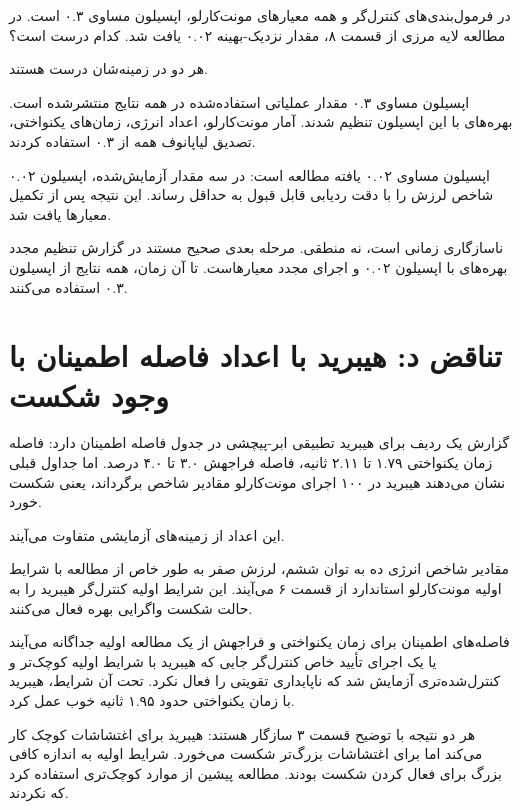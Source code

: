 \documentclass[12pt, a4paper]{article}
\newcommand{\dash}{\lr{---}}
\begin{document}
در فرمول‌بندی‌های کنترل‌گر و همه معيارهای مونت‌کارلو، اپسيلون مساوی ۰.۳ است. در مطالعه لايه مرزی  از قسمت ۸، مقدار نزديک-بهينه ۰.۰۲ يافت شد. کدام درست است؟

هر دو در زمينه‌شان درست هستند.

اپسيلون مساوی ۰.۳ مقدار عملياتی استفاده‌شده در همه نتايج منتشرشده است. بهره‌های  با اين اپسيلون تنظيم شدند. آمار مونت‌کارلو، اعداد انرژی، زمان‌های يکنواختی، تصديق لياپانوف \dash{} همه از ۰.۳ استفاده کردند.

اپسيلون مساوی ۰.۰۲ يافته مطالعه  است: در سه مقدار آزمايش‌شده، اپسيلون ۰.۰۲ شاخص لرزش  را با دقت رديابی قابل قبول به حداقل رساند. اين نتيجه پس از تکميل معيارها يافت شد.

ناسازگاری زمانی است، نه منطقی. مرحله بعدی صحيح \dash{} مستند در گزارش \dash{} تنظيم مجدد بهره‌های  با اپسيلون ۰.۰۲ و اجرای مجدد معيارهاست. تا آن زمان، همه نتايج از اپسيلون ۰.۳ استفاده می‌کنند.

\section{تناقض د: هيبريد با اعداد فاصله اطمينان با وجود شکست}

گزارش يک رديف برای هيبريد تطبيقی ابر-پيچشی در جدول فاصله اطمينان دارد: فاصله زمان يکنواختی ۱.۷۹ تا ۲.۱۱ ثانيه، فاصله فراجهش ۳.۰ تا ۴.۰ درصد. اما جداول قبلی نشان می‌دهند هيبريد در ۱۰۰ اجرای مونت‌کارلو مقادير شاخص برگرداند، يعنی شکست خورد.

اين اعداد از زمينه‌های آزمايشی متفاوت می‌آيند.

مقادير شاخص \dash{} انرژی ده به توان ششم، لرزش صفر \dash{} به طور خاص از مطالعه  با شرايط اوليه مونت‌کارلو استاندارد از قسمت ۶ می‌آيند. اين شرايط اوليه کنترل‌گر هيبريد را به حالت شکست واگرايی بهره فعال می‌کنند.

فاصله‌های اطمينان برای زمان يکنواختی و فراجهش از يک مطالعه اوليه جداگانه می‌آيند \dash{}  يا يک اجرای تأييد خاص کنترل‌گر \dash{} جايی که هيبريد با شرايط اوليه کوچک‌تر و کنترل‌شده‌تری آزمايش شد که ناپايداری تقويتی را فعال نکرد. تحت آن شرايط، هيبريد با زمان يکنواختی حدود ۱.۹۵ ثانيه خوب عمل کرد.

هر دو نتيجه با توضيح قسمت ۳ سازگار هستند: هيبريد برای اغتشاشات کوچک کار می‌کند اما برای اغتشاشات بزرگ‌تر شکست می‌خورد. شرايط اوليه  به اندازه کافی بزرگ برای فعال کردن شکست بودند. مطالعه پيشين از موارد کوچک‌تری استفاده کرد که نکردند.

\end{document}
